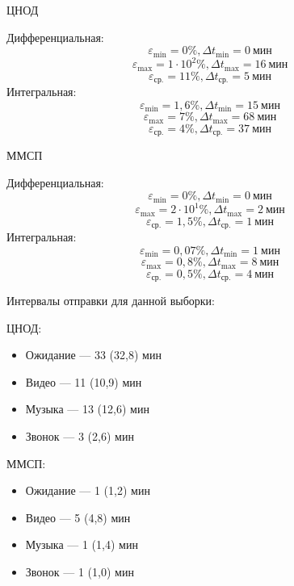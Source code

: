 \documentclass[12pt]{report}
\let\eps\varepsilon
\begin{document}
\begin{minipage}[b]{0.45\textwidth}
    \centering ЦНОД

    Дифференциальная:
        $$\eps_{\min}=0\%, \Delta t_{\min}=0\ \text{мин}$$
        $$\eps_{\max}=1\cdot 10^2\%, \Delta t_{\max}=16\ \text{мин}$$
        $$\eps_{\text{ср.}}=11\%, \Delta t_{\text{ср.}}=5\ \text{мин}$$
    Интегральная:
        $$\eps_{\min}=1,6\%, \Delta t_{\min}=15\ \text{мин}$$
        $$\eps_{\max}=7\%, \Delta t_{\max}=68\ \text{мин}$$
        $$\eps_{\text{ср.}}=4\%, \Delta t_{\text{ср.}}=37\ \text{мин}$$
\end{minipage}
\hfill
\begin{minipage}[b]{0.45\textwidth}
    \centering ММСП

    Дифференциальная:
    $$\eps_{\min}=0\%, \Delta t_{\min}=0\ \text{мин}$$
    $$\eps_{\max}=2\cdot10^{1}\%, \Delta t_{\max}=2\ \text{мин}$$
    $$\eps_{\text{ср.}}=1,5\%, \Delta t_{\text{ср.}}=1\ \text{мин}$$
    Интегральная:
    $$\eps_{\min}=0,07\%, \Delta t_{\min}=1\ \text{мин}$$
    $$\eps_{\max}=0,8\%, \Delta t_{\max}=8\ \text{мин}$$
    $$\eps_{\text{ср.}}=0,5\%, \Delta t_{\text{ср.}}=4\ \text{мин}$$
\end{minipage}

\vspace{0.5cm}
Интервалы отправки для данной выборки:
\vspace{0.5cm}

\begin{minipage}[b]{0.45\textwidth}
    \centering ЦНОД:
    \begin{itemize}
        \item Ожидание — 33 (32,8) мин
        \item Видео — 11 (10,9) мин
        \item Музыка — 13 (12,6) мин
        \item Звонок — 3 (2,6) мин
    \end{itemize}\end{minipage}
\hfill
\begin{minipage}[b]{0.45\textwidth}
    \centering ММСП:
    \begin{itemize}
        \item Ожидание — 1 (1,2) мин
        \item Видео — 5 (4,8) мин
        \item Музыка — 1 (1,4) мин
        \item Звонок — 1 (1,0) мин
    \end{itemize}
\end{minipage}
\end{document}
